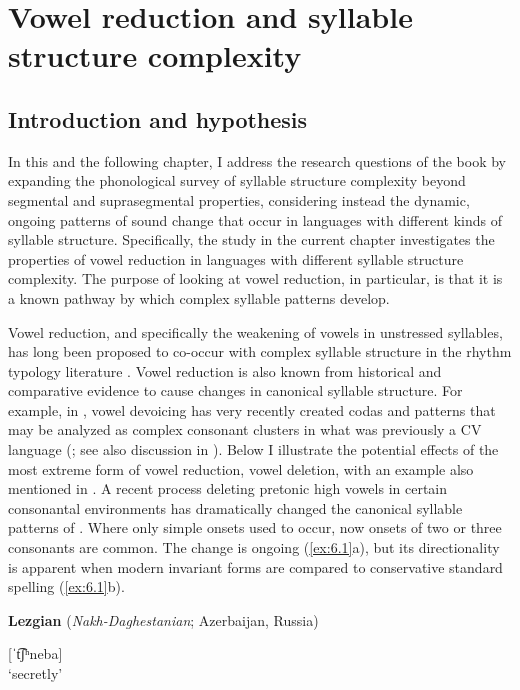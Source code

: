 \chapter{Vowel reduction and syllable structure complexity}\label{sec:6}
\section{Introduction and hypothesis}\label{sec:6.1}

  In this and the following chapter, I address the research questions of the book by expanding the phonological survey of syllable structure complexity beyond segmental and suprasegmental properties, considering instead the dynamic, ongoing patterns of sound change that occur in languages with different kinds of syllable structure. Specifically, the study in the current chapter investigates the properties of vowel reduction in languages with different syllable structure complexity. The purpose of looking at vowel reduction, in particular, is that it is a known pathway by which complex syllable patterns develop.

  Vowel reduction, and specifically the weakening of vowels in unstressed syllables, has long been proposed to co-occur with complex syllable structure in the rhythm typology literature \citep{Auer1993}. Vowel reduction is also known from historical and comparative evidence to cause changes in canonical syllable structure. For example, in , vowel devoicing has very recently created codas and patterns that may be analyzed as complex consonant clusters in what was previously a CV language (\citealt{Givón2011}; see also discussion in ). Below I illustrate the potential effects of the most extreme form of vowel reduction, vowel deletion, with an example also mentioned in . A recent process deleting pretonic high vowels in certain consonantal environments has dramatically changed the canonical syllable patterns of . Where only simple onsets used to occur, now onsets of two or three consonants are common. The change is ongoing (\ref{ex:6.1}a), but its directionality is apparent when modern invariant forms are compared to conservative standard spelling (\ref{ex:6.1}b).

\ea\label{ex:6.1}
  \textbf{Lezgian} (\textit{Nakh-Daghestanian}; Azerbaijan, Russia)

\ea  [t͡ʃʰiˈneba] {\textasciitilde} [ˈt͡ʃʰneba]\\
\glt ‘secretly’

